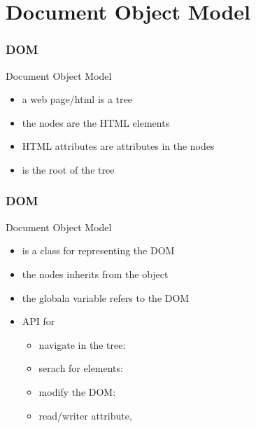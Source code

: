 \section{Document Object Model}

\begin{frame}[fragile]
\frametitle{DOM}
\color{structure}
Document Object Model\\
\begin{itemize}\color{structure}
  \item a web page/html is a tree
  \item the nodes are the HTML elements
  \item HTML attributes are attributes in the nodes
  \item {} is the root of the tree
\end{itemize}
\end{frame}

\begin{frame}[fragile]
\frametitle{DOM}
\color{structure}
Document Object Model\\
\begin{itemize}\color{structure}
\item {} is a class for representing the DOM
\item the nodes inherits from the  object
\item the globala variable  refers to the DOM
\item API for
  \begin{itemize}
    \item navigate in the tree: 
    \item serach for elements: 
    \item modify the DOM: 
    \item read/writer attribute, 
  \end{itemize}
\end{itemize}
\end{frame}

